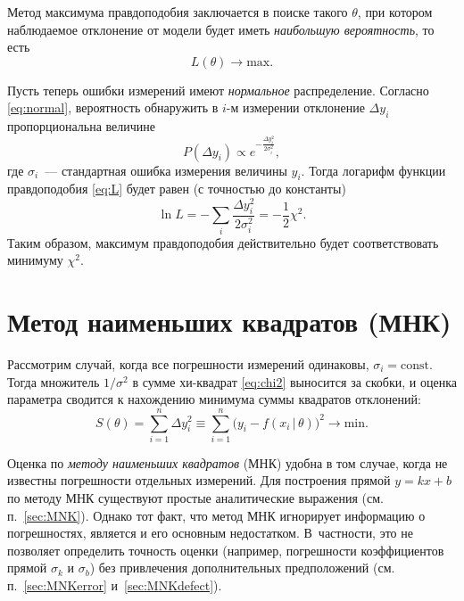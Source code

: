 Метод максимума правдоподобия заключается в поиске такого $\theta$,
при котором наблюдаемое отклонение от модели будет иметь
\emph{наибольшую вероятность}, то есть
\[
L(\theta) \to \mathrm{max}.
\]

Пусть теперь ошибки измерений имеют \emph{нормальное} распределение.
Согласно \eqref{eq:normal}, вероятность обнаружить в $i$-м измерении
отклонение $\Delta y_i$ пропорциональна величине
\[
P(\Delta y_i) \propto e^{-\frac{\Delta y_i^2}{2\sigma_i^2}},
\]
где $\sigma_i$~--- стандартная ошибка измерения величины $y_i$. Тогда
логарифм функции правдоподобия \eqref{eq:L} будет равен (с точностью до константы)
\[
 \ln L = - \sum_i \frac{\Delta y_i^2}{2\sigma_i^2} = - \frac12 \chi^2.
\]
Таким образом, максимум правдоподобия действительно будет соответствовать
минимуму $\chi^2$.

\section{Метод наименьших квадратов (МНК)}

Рассмотрим случай, когда все погрешности измерений одинаковы,
$\sigma_i=\mathrm{const}$. Тогда множитель $1/\sigma^2$ в сумме 
хи-квадрат \eqref{eq:chi2} выносится за скобки, и оценка параметра сводится к нахождению минимума суммы квадратов отклонений:
\begin{equation}
S(\theta) = \sum_{i=1}^n \Delta y_i^2 \equiv \sum_{i=1}^n \Big(y_i - f(x_i\,|\,\theta)\Big)^2 \to \mathrm{min}.
\end{equation}


Оценка по \emph{методу наименьших квадратов} (МНК) удобна в том случае,
когда не известны погрешности отдельных измерений. 
Для построения прямой $y=kx+b$ по методу МНК существуют простые аналитические 
выражения (см. п.~\ref{sec:MNK}).
Однако тот  факт, что
метод МНК игнорирует информацию о погрешностях, является и его основным
недостатком. В~частности, это не позволяет определить точность оценки
(например, погрешности коэффициентов прямой $\sigma_k$ и
$\sigma_b$) без привлечения дополнительных предположений
(см. п.~\ref{sec:MNKerror} и~\ref{sec:MNKdefect}).

